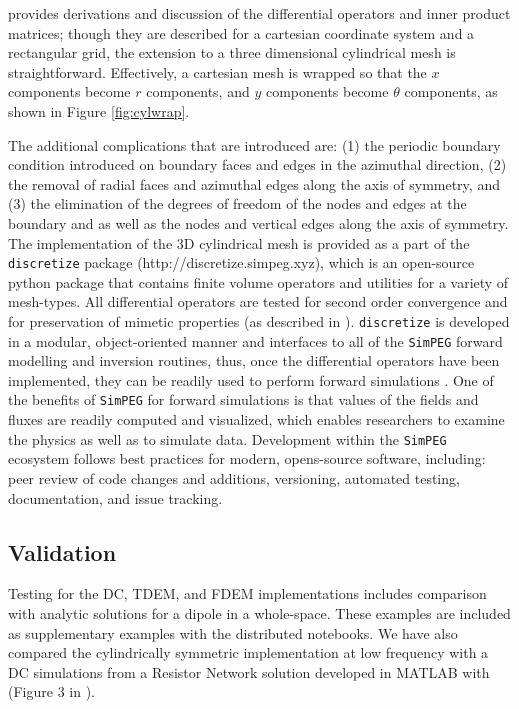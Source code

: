\cite{Haber2014} provides derivations and discussion of the differential operators and inner product matrices; though they are described for a cartesian coordinate system and a rectangular grid, the extension to a three dimensional cylindrical mesh is straightforward. Effectively, a cartesian mesh is wrapped so that the $x$ components become $r$ components, and $y$ components become $\theta$ components, as shown in Figure \ref{fig:cylwrap}.




The additional complications that are introduced are: (1) the periodic boundary condition introduced on boundary faces and edges in the azimuthal direction, (2) the removal of radial faces and azimuthal edges along the axis of symmetry, and (3) the elimination of the degrees of freedom of the nodes and edges at the boundary and as well as the nodes and vertical edges along the axis of symmetry. The implementation of the 3D cylindrical mesh is provided as a part of the \texttt{discretize} package (http://discretize.simpeg.xyz), which is an open-source python package that contains finite volume operators and utilities for a variety of mesh-types. All differential operators are tested for second order convergence and for preservation of mimetic properties (as described in \cite{Haber2014}). \texttt{discretize} is developed in a modular, object-oriented manner and interfaces to all of the \texttt{SimPEG} forward modelling and inversion routines, thus, once the differential operators have been implemented, they can be readily used to perform forward simulations \citep{Cockett2015, Heagy2017}.  One of the benefits of \texttt{SimPEG} for forward simulations is that values of the fields and fluxes are readily computed and visualized, which enables researchers to examine the physics as well as to simulate data. Development within the \texttt{SimPEG} ecosystem follows best practices for modern, opens-source software, including: peer review of code changes and additions, versioning, automated testing, documentation, and issue tracking.

\subsection{Validation}
Testing for the DC, TDEM, and FDEM implementations includes comparison with analytic solutions for a dipole in a whole-space. These examples are included as supplementary examples with the distributed notebooks. We have also compared the cylindrically symmetric implementation at low frequency with a DC simulations from a Resistor Network solution developed in MATLAB with (Figure 3 in \cite{Yang2016}).

